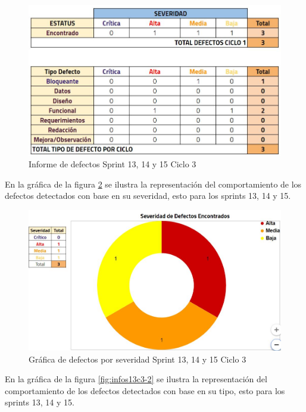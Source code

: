 \begin{figure}[H]
	\begin{center}
		\includegraphics[width=.95\textwidth]{images/pruebas/s13c3}
		\caption{Informe de defectos Sprint 13, 14 y 15  Ciclo 3}
		\label{fig:infos13c3}
	\end{center}
\end{figure}

En la gráfica de la figura \ref{fig:infos13c3-1} se ilustra la representación del comportamiento de los defectos detectados con base en su severidad, esto para los sprints 13, 14 y 15.

\begin{figure}[H]
	\begin{center}
		\includegraphics[width=.75\textwidth]{images/pruebas/s13c3-1}
		\caption{Gráfica de defectos por severidad Sprint 13, 14 y 15  Ciclo 3}
		\label{fig:infos13c3-1}
	\end{center}
\end{figure}

En la gráfica de la figura \ref{fig:infos13c3-2} se ilustra la representación del comportamiento de los defectos detectados con base en su tipo, esto para los sprints 13, 14 y 15.

